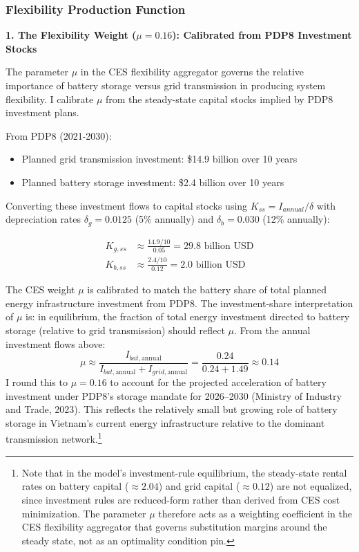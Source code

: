 \documentclass[12pt, a4paper]{article}
\begin{document}
\subsubsection{Flexibility Production Function}

\textbf{1. The Flexibility Weight ($\mu = 0.16$): Calibrated from PDP8 Investment Stocks}

The parameter $\mu$ in the CES flexibility aggregator governs the relative importance of battery storage versus grid transmission in producing system flexibility. I calibrate $\mu$ from the steady-state capital stocks implied by PDP8 investment plans.

From PDP8 (2021-2030):
\begin{itemize}
    \item Planned grid transmission investment: \$14.9 billion over 10 years
    \item Planned battery storage investment: \$2.4 billion over 10 years
\end{itemize}

Converting these investment flows to capital stocks using $K_{ss} = I_{annual}/\delta$ with depreciation rates $\delta_g = 0.0125$ (5\% annually) and $\delta_b = 0.030$ (12\% annually):

\begin{align}
K_{g,ss} &\approx \frac{14.9/10}{0.05} = 29.8 \text{ billion USD} \\
K_{b,ss} &\approx \frac{2.4/10}{0.12} = 2.0 \text{ billion USD}
\end{align}

The CES weight $\mu$ is calibrated to match the battery share of total planned energy infrastructure investment from PDP8. The investment-share interpretation of $\mu$ is: in equilibrium, the fraction of total energy investment directed to battery storage (relative to grid transmission) should reflect $\mu$. From the annual investment flows above:
\begin{equation}
\mu \approx \frac{I_{bat,\text{annual}}}{I_{bat,\text{annual}} + I_{grid,\text{annual}}} = \frac{0.24}{0.24 + 1.49} \approx 0.14
\label{eq:mu_calibration}
\end{equation}
I round this to $\mu = 0.16$ to account for the projected acceleration of battery investment under PDP8's storage mandate for 2026--2030 (Ministry of Industry and Trade, 2023). This reflects the relatively small but growing role of battery storage in Vietnam's current energy infrastructure relative to the dominant transmission network.\footnote{Note that in the model's investment-rule equilibrium, the steady-state rental rates on battery capital ($\approx 2.04$) and grid capital ($\approx 0.12$) are not equalized, since investment rules are reduced-form rather than derived from CES cost minimization. The parameter $\mu$ therefore acts as a weighting coefficient in the CES flexibility aggregator that governs substitution margins around the steady state, not as an optimality condition pin.}
\end{document}
